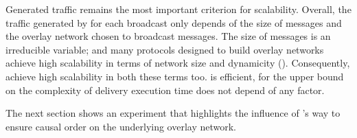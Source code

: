Generated traffic remains the most important criterion for scalability. Overall,
the traffic generated by \CBROADCAST for each broadcast only depends of the size
of messages and the overlay network chosen to broadcast messages. The size of
messages is an irreducible variable; and many protocols designed to build
overlay networks achieve high scalability in terms of network size and
dynamicity (\REF). Consequently, \CBROADCAST achieve high scalability in both
these terms too. \CBROADCAST is efficient, for the upper bound on the complexity
of delivery execution time does not depend of any factor.

The next section shows an experiment that highlights the influence of
\CBROADCAST's way to ensure causal order on the underlying overlay network.

